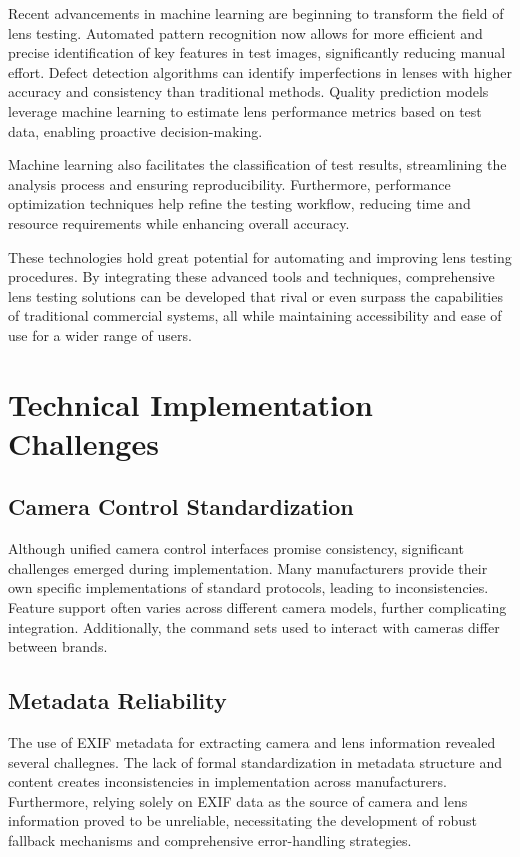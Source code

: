 Recent advancements in machine learning are beginning to transform the field of lens testing. Automated pattern recognition now allows for more efficient and precise identification of key features in test images, significantly reducing manual effort. Defect detection algorithms can identify imperfections in lenses with higher accuracy and consistency than traditional methods. Quality prediction models leverage machine learning to estimate lens performance metrics based on test data, enabling proactive decision-making.

Machine learning also facilitates the classification of test results, streamlining the analysis process and ensuring reproducibility. Furthermore, performance optimization techniques help refine the testing workflow, reducing time and resource requirements while enhancing overall accuracy.

These technologies hold great potential for automating and improving lens testing procedures. By integrating these advanced tools and techniques, comprehensive lens testing solutions can be developed that rival or even surpass the capabilities of traditional commercial systems, all while maintaining accessibility and ease of use for a wider range of users.

\section{Technical Implementation Challenges}

\subsection{Camera Control Standardization}

Although unified camera control interfaces promise consistency, significant challenges emerged during implementation. Many manufacturers provide their own specific implementations of standard protocols, leading to inconsistencies. Feature support often varies across different camera models, further complicating integration. Additionally, the command sets used to interact with cameras differ between brands.

\subsection{Metadata Reliability}

The use of EXIF metadata for extracting camera and lens information revealed several challegnes. The lack of formal standardization in metadata structure and content creates inconsistencies in implementation across manufacturers. Furthermore, relying solely on EXIF data as the source of camera and lens information proved to be unreliable, necessitating the development of robust fallback mechanisms and comprehensive error-handling strategies.